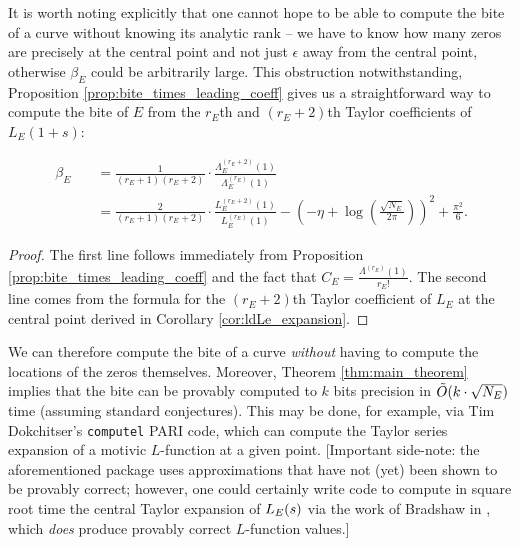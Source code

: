 It is worth noting explicitly that one cannot hope to be able to compute the bite of a curve without knowing its analytic rank -- we have to know how many zeros are precisely at the central point and not just $\epsilon$ away from the central point, otherwise $\beta_E$ could be arbitrarily large. This obstruction notwithstanding, Proposition \ref{prop:bite_times_leading_coeff} gives us a straightforward way to compute the bite of $E$ from the $r_E$th and $(r_E+2)$th Taylor coefficients of $L_E(1+s)$:
\begin{corollary}[GRH]
\begin{align}\
\beta_E \quad &= \frac{1}{(r_E+1)(r_E+2)} \cdot \frac{\Lambda_E^{(r_E+2)}(1)}{\Lambda_E^{(r_E)}(1)} \label{eqn:bite_via_Lams} \\
&= \frac{2}{(r_E+1)(r_E+2)} \cdot \frac{L_E^{(r_E+2)}(1)}{L_E^{(r_E)}(1)} - \left(-\eta+\log\left(\frac{\sqrt{N_E}}{2\pi}\right)\right)^2 + \frac{\pi^2}{6} \label{eqn:bite_via_L_E}.
\end{align}
\end{corollary}
\begin{proof}
The first line follows immediately from Proposition \ref{prop:bite_times_leading_coeff} and the fact that $C_E = \frac{\Lambda^{(r_E)}(1)}{r_E!}$. The second line comes from the formula for the $(r_E+2)$th Taylor coefficient of $L_E$ at the central point derived in Corollary \ref{cor:ldLe_expansion}.
\end{proof}
We can therefore compute the bite of a curve {\it without} having to compute the locations of the zeros themselves. Moreover, Theorem \ref{thm:main_theorem} implies that the bite can be provably computed to $k$ bits precision in $\tilde{O}(k\cdot \sqrt{N_E})$ time (assuming standard conjectures). This may be done, for example, via Tim Dokchitser's {\tt computel} PARI code, which can compute the Taylor series expansion of a motivic $L$-function at a given point. [Important side-note: the aforementioned package uses approximations that have not (yet) been shown to be provably correct; however, one could certainly write code to compute in square root time the central Taylor expansion of $L_E(s)$ via the work of Bradshaw in \cite{Bra-2010}, which {\it does} produce provably correct $L$-function values.] \\

